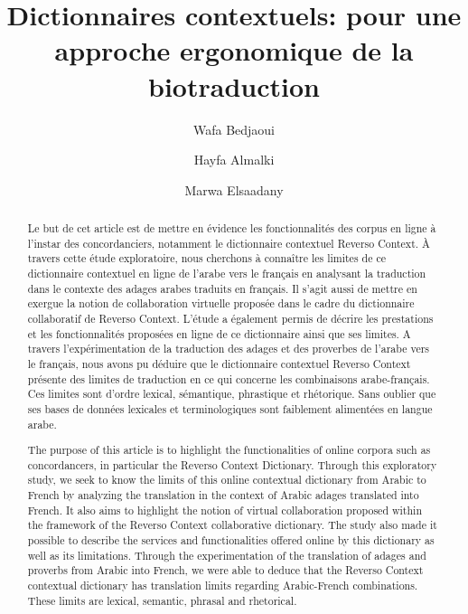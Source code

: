 \documentclass[french,english,brazil]{textolivre}
\title{Dictionnaires contextuels: pour une approche ergonomique de la biotraduction}
\author[1]{Wafa Bedjaoui}
\author[2]{Hayfa Almalki}
\author[3]{Marwa Elsaadany}
\affil[1]{Princess Nourah bint Abdulrahman University, Riyad/Arabie Saoudite. \newline Email: \url{wfbedjaoui@pnu.edu.sa} \orcid{0000-0002-0660-8418}}
\affil[2]{Princess Nourah bint Abdulrahman University, Riyad/Arabie Saoudite. \newline Email: \url{haalmalki@outlook.sa}}
\affil[3]{Princess Nourah bint Abdulrahman University, Riyad/Arabie Saoudite. \newline Email: \url{maabdelFatah@pnu.edu.sa} \orcid{0000-0002-6867-4250}}
\begin{document}
\maketitle

\begin{poliabstract}
\begin{abstract}
Le but de cet article est de mettre en évidence les fonctionnalités des corpus en ligne à l'instar des concordanciers, 
notamment le dictionnaire contextuel Reverso Context. À travers cette étude exploratoire, nous cherchons à connaître les limites 
de ce dictionnaire contextuel en ligne de l'arabe vers le français en analysant la traduction dans le contexte des adages arabes 
traduits en français. Il s'agit aussi de mettre en exergue la notion de collaboration virtuelle proposée dans le cadre du 
dictionnaire collaboratif de Reverso Context. L'étude a également permis de décrire les prestations et les fonctionnalités 
proposées en ligne de ce dictionnaire ainsi que ses limites. A travers l'expérimentation de la traduction des adages et des 
proverbes de l'arabe vers le français, nous avons pu déduire que le dictionnaire contextuel Reverso Context présente des limites 
de traduction en ce qui concerne les combinaisons arabe-français. Ces limites sont d’ordre lexical, sémantique, phrastique et 
rhétorique. Sans oublier que ses bases de données lexicales et terminologiques sont faiblement alimentées en langue arabe.

\end{abstract}

\begin{english}
\begin{abstract}
The purpose of this article is to highlight the functionalities of online corpora such as concordancers, 
in particular the Reverso Context Dictionary. Through this exploratory study, we seek to know the limits 
of this online contextual dictionary from Arabic to French by analyzing the translation in the context of 
Arabic adages translated into French. It also aims to highlight the notion of virtual collaboration proposed 
within the framework of the Reverso Context collaborative dictionary. The study also made it possible to 
describe the services and functionalities offered online by this dictionary as well as its limitations. 
Through the experimentation of the translation of adages and proverbs from Arabic into French, we were able 
to deduce that the Reverso Context contextual dictionary has translation limits regarding Arabic-French 
combinations. These limits are lexical, semantic, phrasal and rhetorical.


\end{abstract}
\end{english}
\end{poliabstract}
\end{document}

